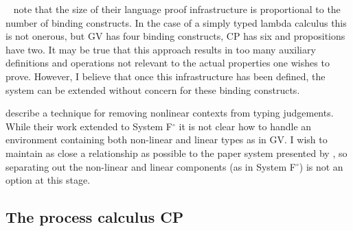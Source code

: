 \documentclass{mpaper}
\newcommand{\fpop}{System F${}^\circ$\xspace}
\begin{document}
\citeauthor{Aydemir:2008:EFM}~\cite{Aydemir:2008:EFM} note that the size of
their language proof infrastructure is proportional to the number of binding
constructs. In the case of a simply typed lambda calculus this is not onerous,
but GV has four binding constructs, CP has six and propositions have two. It
may be true that this approach results in too many auxiliary definitions and
operations not relevant to the actual properties one wishes to prove. However,
I believe that once this infrastructure has been defined, the system can be
extended without concern for these binding constructs.

\citeauthor{Park:2014:MMW} describe a technique for
removing nonlinear contexts from typing judgements. While their work extended
to \fpop it is not clear how to handle an environment containing both
non-linear and linear types as in GV. I wish to maintain as close a
relationship as possible to the paper system presented by
\citeauthor{Wadler:2014}, so separating out the non-linear and linear
components (as in \fpop) is not an option at this stage.

\begin{comment}
\section{Issues}

\begin{itemize}
\item What is required of a Metatheory library for linear type systems?
  Permutation reasoning? Weakening/Contraction for non-linear components?
\item Discuss the different approaches that were taken to maintain close
  correspondence with the paper presentation
\item Make sure to note that the paper leaves details (a lot of the ``cruft'')
  out of the proofs e.g. where weakening is applied in the typing derivations
\item Mention the use of Metatheory and its limitations when mechanising
  linear type systems like GV/CP
\end{itemize}
\end{comment}

\subsection{The process calculus CP}\label{sec:cp}

\begin{comment}
FIGURES

propositions

processes

typing judgements

equivalences and axiomatic cut

principal cut rules

commuting conversions
\end{comment}
\end{document}
